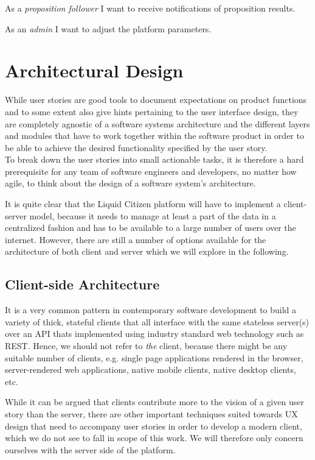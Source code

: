  As a \textit{proposition follower} I want to receive notifications of proposition results.

 As an \textit{admin} I want to adjust the platform parameters.

\section{Architectural Design}
\label{sec:ArchitecturalDesign}

While user stories are good tools to document expectations on product functions and to some extent also give hints pertaining to the user interface design, they are completely agnostic of a software systems architecture and the different layers and modules that have to work together within the software product in order to be able to achieve the desired functionality specified by the user story.\\
To break down the user stories into small actionable tasks, it is therefore a hard prerequisite for any team of software engineers and developers, no matter how agile, to think about the design of a software system's architecture.

It is quite clear that the Liquid Citizen platform will have to implement a client-server model, because it needs to manage at least a part of the data in a centralized fashion and has to be available to a large number of users over the internet.
However, there are still a number of options available for the architecture of both client and server which we will explore in the following.

\subsection{Client-side Architecture}
\label{ssec:ClientSideArchitecture}
It is a very common pattern in contemporary software development to build a variety of thick, stateful clients that all interface with the same stateless server(s) over an API thats implemented using industry standard web technology such as REST.
Hence, we should not refer to \textit{the} client, because there might be any suitable number of clients, e.g. single page applications rendered in the browser, server-rendered web applications, native mobile clients, native desktop clients, etc.

While it can be argued that clients contribute more to the vision of a given user story than the server, there are other important techniques suited towards UX design that need to accompany user stories in order to develop a modern client, which we do not see to fall in scope of this work.
We will therefore only concern ourselves with the server side of the platform.

